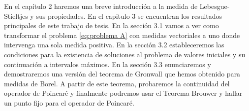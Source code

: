 En el capítulo 2 haremos una breve introducción a la medida de Lebesgue-Stieltjes y sus propiedades. 
En el capitulo 3 se encuentran los resultados principales de este trabajo de tesis. En la sección 3.1 vamos a ver como transformar el problema \eqref{eq:problema A} con medidas vectoriales a uno donde intervenga una sola medida positiva. En la sección 3.2 estableceremos las condiciones para la existencia de soluciones al problema de valores iniciales y su continuación a intervalos máximos. En la sección 3.3 enunciaremos y demostraremos una versión del teorema de Gronwall que hemos obtenido para medidas de Borel. A partir de este teorema, probaremos  la continuidad del operador de Poincaré y finalmente podremos usar el Teorema Brouwer y 
hallar un punto fijo para el operador de Poincaré.  









